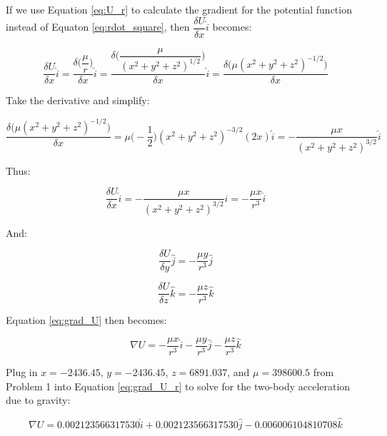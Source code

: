 \documentclass[conf]{new-aiaa}
\begin{document}
If we use Equation \ref{eq:U_r} to calculate the gradient for the potential function instead of Equaton \ref{eq:rdot_square}, then $\dfrac{\delta U}{\delta x} \hat{i}$ becomes: 

\begin{equation}
\frac{\delta U}{\delta x} \hat{i} = 
\dfrac{\delta \Big( \dfrac{\mu}{r} \Big) }{\delta x} \hat{i} = 
\dfrac{ \delta \Big( \dfrac{\mu}{ ( x^2 + y^2 + z^2 )^{1/2} } \Big) }{\delta x} \hat{i} = 
\dfrac{\delta \big( \mu ( x^2 + y^2 + z^2 )^{-1/2} \big) }{ \delta x }
\end{equation}

Take the derivative and simplify: 

\begin{equation}
\dfrac{\delta \big( \mu ( x^2 + y^2 + z^2 )^{-1/2} \big) }{ \delta x } = 
 \mu \Big( -\frac{1}{2} \Big) ( x^2 + y^2 + z^2 )^{-3/2} ( 2x ) \hat{i} = 
 - \dfrac{\mu x}{ ( x^2 + y^2 + z^2 )^{3/2} } \hat{i}
\end{equation}

Thus: 

\begin{equation}
\frac{\delta U}{\delta x} \hat{i} = - \dfrac{\mu x}{ ( x^2 + y^2 + z^2 )^{3/2} } \hat{i} = - \dfrac{\mu x}{r^3} \hat{i}
\end{equation}

And: 

\begin{equation}
\frac{\delta U}{\delta y} \hat{j} = - \dfrac{\mu y}{r^3} \hat{j}
\end{equation}

\begin{equation}
\frac{\delta U}{\delta z} \hat{k} = - \dfrac{\mu z}{r^3} \hat{k}
\end{equation}

Equation \ref{eq:grad_U} then becomes: 

\begin{equation}
\nabla U = - \dfrac{\mu x}{r^3} \hat{i} - \dfrac{\mu y}{r^3} \hat{j} - \dfrac{\mu z}{r^3} \hat{k}
\label{eq:grad_U_r}
\end{equation}

Plug in $x = -2436.45$, $y = -2436.45$, $z = 6891.037$, and $\mu = 398600.5$ from Problem 1 into Equation \ref{eq:grad_U_r} to solve for the two-body acceleration due to gravity: 

\begin{equation}
\nabla U = 0.002123566317530 \hat{i} + 0.002123566317530 \hat{j} - 0.006006104810708 \hat{k}
\end{equation}
\end{document}
